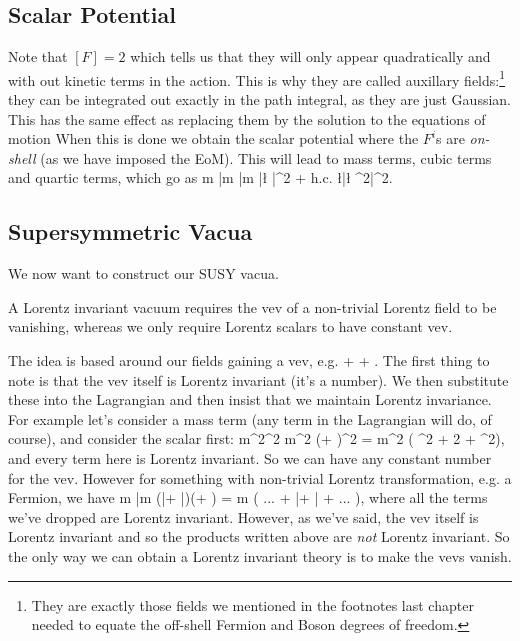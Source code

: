 \subsection{Scalar Potential}

Note that $[F]=2$ which tells us that they will only appear quadratically and with out kinetic terms in the action. This is why they are called auxillary fields:\footnote{They are exactly those fields we mentioned in the footnotes last chapter needed to equate the off-shell Fermion and Boson degrees of freedom.} they can be integrated out exactly in the path integral, as they are just Gaussian. This has the same effect as replacing them by the solution to the equations of motion 
\noindent When this is done we obtain the scalar potential 
\noindent where the $F^i$s are \textit{on-shell} (as we have imposed the EoM). This will lead to mass terms, cubic terms and quartic terms, which go as 
\bse 
    m \bar{m} \bar{\phi}\phi \qquad m \bar{\l} \phi \bar{\phi}^2 + h.c. \qand \l\bar{\l} \phi^2\bar{\phi}^2.
\ese 

\subsection{Supersymmetric Vacua}

We now want to construct our SUSY vacua. 

\bcl 
    A Lorentz invariant vacuum requires the vev of a non-trivial Lorentz field to be vanishing, whereas we only require Lorentz scalars to have constant vev.  
\ecl 

\bq 
    The idea is based around our fields gaining a vev, e.g. 
    \bse 
        \phi \to \la \phi \ra + \phi \qand \psi \to \la \psi \ra + \psi.
    \ese 
    The first thing to note is that the vev itself is Lorentz invariant (it's a number). We then substitute these into the Lagrangian and then insist that we maintain Lorentz invariance. For example let's consider a mass term (any term in the Lagrangian will do, of course), and consider the scalar first:
    \bse 
        m^2\phi^2 \to m^2 (\la \phi\ra + \phi)^2 = m^2 \big(  \la\phi\ra^2 + 2 \la \phi \ra \phi + \phi^2\big),
    \ese 
    and every term here is Lorentz invariant. So we can have any constant number for the vev. However for something with non-trivial Lorentz transformation, e.g. a Fermion, we have 
    \bse 
        m \bar{\psi}\psi \to m \big(\la \bar{\psi}\ra + \bar{\psi}\big)\big(\la\psi\ra + \psi) = m \big( ... + \la \bar{\psi}\ra \psi + \la\psi\ra \bar{\psi} + ... \big),
    \ese 
    where all the terms we've dropped are Lorentz invariant. However, as we've said, the vev itself is Lorentz invariant and so the products written above are \textit{not} Lorentz invariant. So the only way we can obtain a Lorentz invariant theory is to make the vevs vanish. 
\eq 

